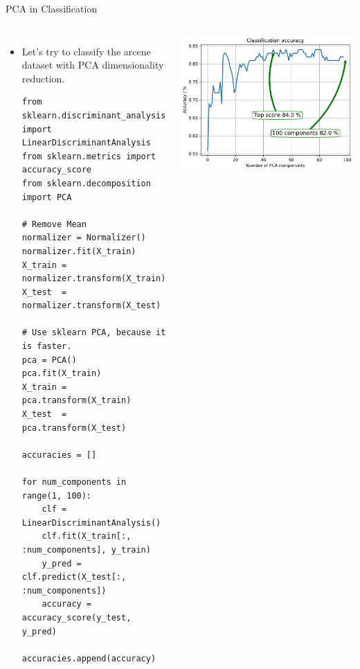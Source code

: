 \documentclass[10pt, aspectratio=169]{beamer} %
\begin{document}
\begin{frame}[fragile, allowframebreaks=0.8]{PCA in Classification}
		\begin{columns}
	    \begin{itemize}
\item Let's try to classify the arcene dataset with PCA dimensionality reduction.

\begin{lstlisting}
from sklearn.discriminant_analysis import LinearDiscriminantAnalysis
from sklearn.metrics import accuracy_score
from sklearn.decomposition import PCA
	
# Remove Mean
normalizer = Normalizer()
normalizer.fit(X_train)
X_train = normalizer.transform(X_train)
X_test  = normalizer.transform(X_test)	

# Use sklearn PCA, because it is faster.
pca = PCA()
pca.fit(X_train)
X_train = pca.transform(X_train)
X_test  = pca.transform(X_test)

accuracies = []

for num_components in range(1, 100):
    clf = LinearDiscriminantAnalysis()
    clf.fit(X_train[:, :num_components], y_train)    
    y_pred = clf.predict(X_test[:, :num_components])    
    accuracy = accuracy_score(y_test, y_pred)
    accuracies.append(accuracy)
\end{lstlisting}

\end{itemize}
			
		\begin{center}
			\includegraphics[width=\columnwidth]{arcene_pca.pdf}
		\end{center}
		\end{columns}
\end{frame}
\end{document}
